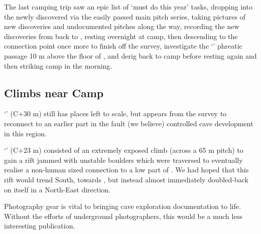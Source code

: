 The last camping trip saw an epic list of `must do this year' tasks,
dropping into the newly discovered  via the
easily passed main pitch series, taking pictures of new discoveries and
undocumented pitches along the way, recording the new discoveries from
 back to , resting overnight at
camp, then descending to the connection point once more to finish off
the survey, investigate the `' phreatic passage 10 m
above the floor of , and derig back to camp before
resting again and then striking camp in the morning.

\subsection{Climbs near Camp}

`' (C+30 m) still has places left to scale, but appears
from the survey to reconnect to an earlier part in the fault (we
believe) controlled cave development in this region.

`' (C+23 m) consisted of an extremely exposed climb (across a
65 m pitch) to gain a rift jammed with unstable boulders which were
traversed to eventually realise a non-human sized connection to a low
part of . We had hoped that this rift would trend
South, towards , but instead almost immediately doubled-back on
itself in a North-East direction.


    \begin{marginfigure}
\checkoddpage \ifoddpage \forcerectofloat \else \forceversofloat \fi
\centering
 \caption{Photography gear is vital to bringing cave exploration documentation to life. Without the efforts of underground photographers, this would be a much less interesting publication. }
 \label{photo kit 2009}
\end{marginfigure}




